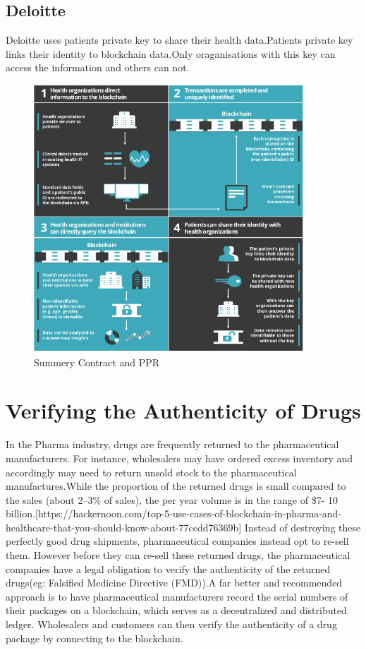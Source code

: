 \documentclass[12pt]{report}
\begin{document}
\subsection{Deloitte}
Deloitte uses patients private key to share their health data.Patients private key links their identity to blockchain data.Only oraganisations with this key can access the information and others can not.
\begin{figure}[H]
\centering
\includegraphics[width=0.9\textwidth]{diloitte.png}
\caption{Summery Contract and PPR}
\label{ppr}
\end{figure}

\section{Verifying the Authenticity of Drugs}

In the Pharma industry, drugs are frequently returned to the pharmaceutical manufacturers. For instance, wholesalers may have ordered excess inventory and accordingly may need to return unsold stock to the pharmaceutical manufactures.While the proportion of the returned drugs is small compared to the sales (about 2–3\% of sales), the per year volume is in the range of \$7- 10 billion.[https://hackernoon.com/top-5-use-cases-of-blockchain-in-pharma-and-healthcare-that-you-should-know-about-77ccdd76369b]
Instead of destroying these perfectly good drug shipments, pharmaceutical companies instead opt to re-sell them. However before they can re-sell these returned drugs, the pharmaceutical companies have a legal obligation to verify the authenticity of the returned drugs(eg: Falsified Medicine Directive (FMD)).A far better and recommended approach is to have pharmaceutical manufacturers record the serial numbers of their packages on a blockchain, which serves as a decentralized and distributed ledger. Wholesalers and customers can then verify the authenticity of a drug package by connecting to the blockchain.
\end{document}

